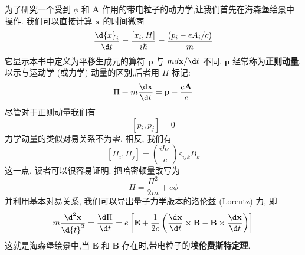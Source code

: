 为了研究一个受到 $\phi$ 和 $\mathbf{A}$ 作用的带电粒子的动力学,让我们首先在海森堡绘景中操作. 我们可以直接计算 $\mathbf{x}$ 的时间微商
\begin{equation}
\frac{\d {x}_{i}}{\d t} = \frac{\left\lbrack {x}_{i}, H\right\rbrack }{i\hbar } = \frac{\left( {p}_{i} - e{A}_{i}/c\right) }{m}
\end{equation}
它显示本书中定义为平移生成元的算符 $\mathbf{p}$ 与 ${md}\mathbf{x}/{\d t}$ 不同. $\mathbf{p}$ 经常称为\textbf{正则动量},以示与运动学 (或力学) 动量的区别,后者用 $\Pi$ 标记:
\begin{equation}
\Pi \equiv m\frac{\d \mathbf{x}}{\d t} = \mathbf{p} - \frac{e\mathbf{A}}{c}
\end{equation}
尽管对于正则动量我们有
\begin{equation}
\left\lbrack {{p}_{i},{p}_{j}}\right\rbrack = 0
\end{equation}
力学动量的类似对易关系不为零. 相反, 我们有
\begin{equation}
\left\lbrack {{\Pi }_{i},{\Pi }_{j}}\right\rbrack = \left( \frac{ihe}{c}\right) {\varepsilon }_{ijk}{B}_{k}
\end{equation}
这一点, 读者可以很容易证明. 把哈密顿量改写为
\begin{equation}
H = \frac{{\Pi }^{2}}{2m} + {e\phi }
\end{equation}
并利用基本对易关系, 我们可以导出量子力学版本的洛伦兹 (Lorentz) 力, 即
\begin{equation}
m\frac{{\d}^{2}\mathbf{x}}{\d{t}^{2}} = \frac{\d \Pi }{\d t} = e\left\lbrack {\mathbf{E} + \frac{1}{2c}\left( {\frac{\d \mathbf{x}}{\d t} \times \mathbf{B} - \mathbf{B} \times \frac{\d \mathbf{x}}{\d t}}\right) }\right\rbrack
\end{equation}
这就是海森堡绘景中,当 $\mathbf{E}$ 和 $\mathbf{B}$ 存在时,带电粒子的\textbf{埃伦费斯特定理}.

